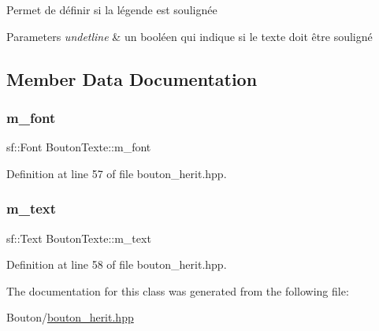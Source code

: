 Permet de définir si la légende est soulignée 
\begin{DoxyParams}{Parameters}
{\em undetline} & un booléen qui indique si le texte doit être souligné \\
\hline
\end{DoxyParams}


\subsection{Member Data Documentation}
\mbox{\label{classBoutonTexte_a92d3ce11bc4a1719d86458bad2f05849}} 
\subsubsection{\texorpdfstring{m\+\_\+font}{m\_font}}
{\footnotesize\ttfamily sf\+::\+Font Bouton\+Texte\+::m\+\_\+font\hspace{0.3cm}{\ttfamily [protected]}}



Definition at line 57 of file bouton\+\_\+herit.\+hpp.

\mbox{\label{classBoutonTexte_a96c677df7e44162cc9206e84fe2692cf}} 
\subsubsection{\texorpdfstring{m\+\_\+text}{m\_text}}
{\footnotesize\ttfamily sf\+::\+Text Bouton\+Texte\+::m\+\_\+text\hspace{0.3cm}{\ttfamily [protected]}}



Definition at line 58 of file bouton\+\_\+herit.\+hpp.



The documentation for this class was generated from the following file\+:\begin{DoxyCompactItemize}
\item 
Bouton/\hyperlink{bouton__herit_8hpp}{bouton\+\_\+herit.\+hpp}\end{DoxyCompactItemize}
